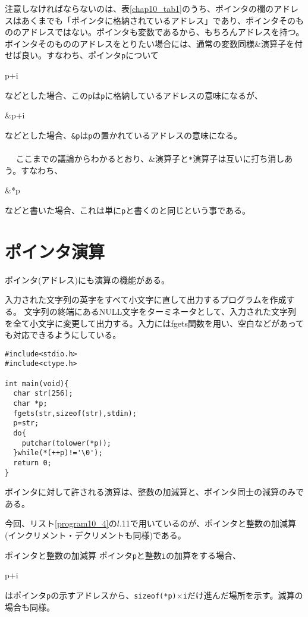 注意しなければならないのは、表\ref{chap10_tab1}のうち、ポインタの欄のアドレスはあくまでも「ポインタに格納されているアドレス」であり、ポインタそのもののアドレスではない。ポインタも変数であるから、もちろんアドレスを持つ。ポインタそのもののアドレスをとりたい場合には、通常の変数同様\&演算子を付せば良い。すなわち、ポインタ\verb|p|について
\begin{code}
p+i
\end{code}
などとした場合、この\verb|p|は\verb|p|に格納しているアドレスの意味になるが、
\begin{code}
&p+i
\end{code}
などとした場合、\verb|&p|は\verb|p|の置かれているアドレスの意味になる。
\\ \\　
ここまでの議論からわかるとおり、\&演算子と\verb|*|演算子は互いに打ち消しあう。すなわち、
\begin{code}
&*p
\end{code}
などと書いた場合、これは単に\verb|p|と書くのと同じという事である。

\section{ポインタ演算}
ポインタ(アドレス)にも演算の機能がある。
\begin{boxnote}
\begin{multicols}{2}
入力された文字列の英字をすべて小文字に直して出力するプログラムを作成する。
文字列の終端にあるNULL文字をターミネータとして、入力された文字列を全て小文字に変更して出力する。入力にはfgets関数を用い、空白などがあっても対応できるようにしている。
\begin{lstlisting}[caption=文字列の小文字出力,label=program10_4]
#include<stdio.h>
#include<ctype.h>

int main(void){
  char str[256];
  char *p;
  fgets(str,sizeof(str),stdin);
  p=str;
  do{
    putchar(tolower(*p));
  }while(*(++p)!='\0');
  return 0;
}
\end{lstlisting}
\end{multicols}
\end{boxnote}
ポインタに対して許される演算は、整数の加減算と、ポインタ同士の減算のみである。

今回、リスト\ref{program10_4}の$l$.11で用いているのが、ポインタと整数の加減算(インクリメント・デクリメントも同様)である。
\begin{itembox}[l]{ポインタと整数の加減算}
ポインタ\verb|p|と整数\verb|i|の加算をする場合、
\begin{code}
p+i
\end{code}
はポインタ\verb|p|の示すアドレスから、\verb|sizeof(*p)|$\times$\verb|i|だけ進んだ場所を示す。減算の場合も同様。
\end{itembox}

